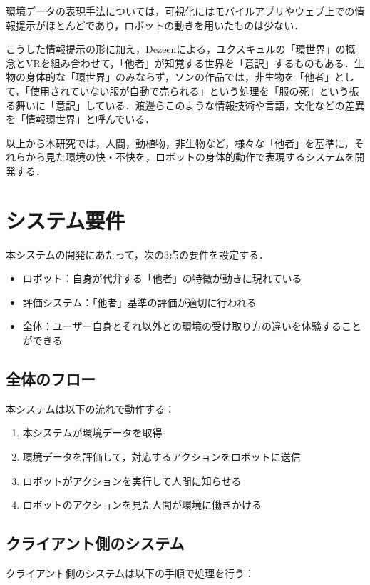 \documentclass[paper=a4paper,jafontsize=9pt,head_space=15mm,gutter=20mm,
twocolumn,number_of_lines=49, line_length=26zw]{myuarticle}
\begin{document}
環境データの表現手法については，可視化にはモバイルアプリやウェブ上での情報提示がほとんどであり\cite{Saini-2020-IndoorAirQualityMonitoring}，ロボットの動きを用いたものは少ない．

こうした情報提示の形に加え，Dezeen\cite{-2015-VirtualRealityPresentsForest}による，ユクスキュルの「環世界」の概念とVRを組み合わせて，「他者」が知覚する世界を「意訳」\cite{情報環世界}するものもある．生物の身体的な「環世界」のみならず，ソン\cite{--ソンヨン}の作品では，非生物を「他者」として，「使用されていない服が自動で売られる」という処理を「服の死」という振る舞いに「意訳」している．渡邊ら\cite{渡邉-2019-情報環世}このような情報技術や言語，文化などの差異を「情報環世界」と呼んでいる．

以上から本研究では，人間，動植物，非生物など，様々な「他者」を基準に，それらから見た環境の快・不快を，ロボットの身体的動作で表現するシステムを開発する．

\section{システム要件}
本システムの開発にあたって，次の3点の要件を設定する．

\begin{itemize}
  \item ロボット：自身が代弁する「他者」の特徴が動きに現れている
  \item 評価システム：「他者」基準の評価が適切に行われる
  \item 全体：ユーザー自身とそれ以外との環境の受け取り方の違いを体験することができる
\end{itemize}

\subsection{全体のフロー}
本システムは以下の流れで動作する：

\begin{enumerate}
  \item 本システムが環境データを取得
  \item 環境データを評価して，対応するアクションをロボットに送信
  \item ロボットがアクションを実行して人間に知らせる
  \item ロボットのアクションを見た人間が環境に働きかける
\end{enumerate}

\subsection{クライアント側のシステム}
クライアント側のシステムは以下の手順で処理を行う：
\end{document}
